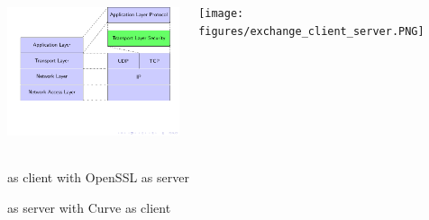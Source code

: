 \section{\embtls}


\begin{frame}

\begin{columns}

\begin{column}{0.6\textwidth}

\includegraphics[trim=0.5cm 2cm 14cm 0cm, height=4cm]{figures/tls_osi.pdf}

\end{column}


\begin{column}{0.5\textwidth}

\texttt{[image: figures/exchange\_client\_server.PNG]}

\end{column}

\end{columns}

\begin{itemize}
  \normalsize{
  \item \embtls as client with OpenSSL as server
  \item \embtls as server with Curve as client
  }
\end{itemize}

\end{frame}

